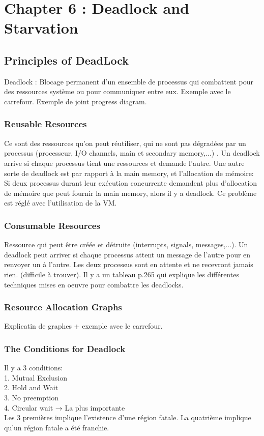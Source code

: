 
\section{Chapter 6 : Deadlock and Starvation}

\subsection{Principles of DeadLock}
Deadlock : Blocage permanent d’un ensemble de processus qui combattent pour des ressources système ou pour communiquer entre eux. Exemple avec le carrefour. Exemple de joint progress diagram.
\subsubsection{Reusable Resources}
Ce sont des ressources qu’on peut réutiliser, qui ne sont pas dégradées par un processus (processeur, I/O channels, main et secondary memory,...) . Un deadlock arrive si chaque processus tient une ressources et demande l’autre. Une autre sorte de deadlock est par rapport à la main memory, et l’allocation de mémoire: Si deux processus durant leur exécution concurrente demandent plus d’allocation de mémoire que peut fournir la main memory, alors il y a deadlock. Ce problème est réglé avec l’utilisation de la VM.
\subsubsection{Consumable Resources}
Ressource qui peut être créée et détruite (interrupts, signals, messages,...). Un deadlock peut arriver si chaque processus attent un message de l’autre pour en renvoyer un à l’autre. Les deux processus sont en attente et ne recevront jamais rien. (difficile à trouver). Il y a un tableau p.265 qui explique les différentes techniques mises en oeuvre pour combattre les deadlocks.
\subsubsection{Resource Allocation Graphs}
Explicatin de graphes + exemple avec le carrefour.
\subsubsection{The Conditions for Deadlock}
Il y a 3 conditions: \\
1. Mutual Exclusion \\
2. Hold and Wait\\
3. No preemption\\
4. Circular wait → La plus importante\\
Les 3 premières implique l’existence d’une région fatale. La quatrième implique qu’un région fatale a été franchie.
